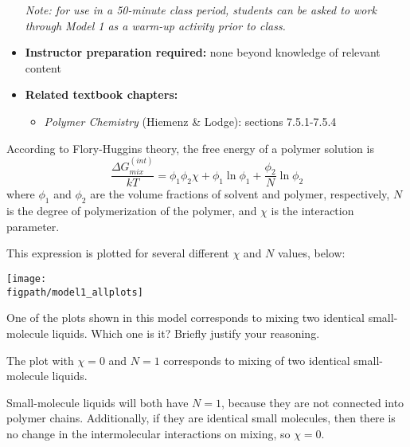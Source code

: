 \begin{activity}
\begin{instructornotes}
\begin{itemize}
			\emph{Note: for use in a 50-minute class period, students can be asked to work through Model 1 as a warm-up activity prior to class.}
			
		\item \textbf{Instructor preparation required:} none beyond knowledge of relevant content
		\item \textbf{Related textbook chapters:}
			\begin{itemize}
				\item \emph{Polymer Chemistry} (Hiemenz \& Lodge): sections 7.5.1-7.5.4
			\end{itemize}
	\end{itemize}

\end{instructornotes}


\begin{model}

According to Flory-Huggins theory, the free energy of a polymer solution is
\begin{equation*}
	\frac{\Delta G_{mix}^{(int)}}{kT} = \phi_1 \phi_2 \chi + \phi_1 \ln \phi_1 + \frac{\phi_2}{N}\ln \phi_2
\end{equation*}
where $\phi_1$ and $\phi_2$ are the volume fractions of solvent and polymer, respectively, $N$ is the degree of polymerization of the polymer, and $\chi$ is the interaction parameter.

This expression is plotted for several different $\chi$ and $N$ values, below:

\centerline{
	\texttt{[image: \\figpath/model1\_allplots]}}

\end{model}

\begin{ctqs}

	\question One of the plots shown in this model corresponds to mixing two identical small-molecule liquids.  Which one is it?  Briefly justify your reasoning.
	
		\begin{solution}[1.5in]
		
			The plot with $\chi=0$ and $N=1$ corresponds to mixing of two identical small-molecule liquids.
						
			Small-molecule liquids will both have $N=1$, because they are not connected into polymer chains.  Additionally, if they are identical small molecules, then there is no change in the intermolecular interactions on mixing, so $\chi=0$.
			

\end{solution}
\end{ctqs}
\end{activity}
